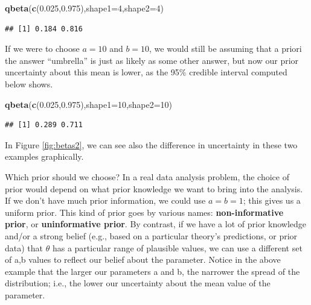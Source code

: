 \documentclass[12pt,]{krantz}
\newenvironment{Shaded}{\begin{snugshade}}{\end{snugshade}}
\newcommand{\KeywordTok}[1]{\textcolor[rgb]{0.13,0.29,0.53}{\textbf{#1}}}
\newcommand{\DataTypeTok}[1]{\textcolor[rgb]{0.13,0.29,0.53}{#1}}
\newcommand{\DecValTok}[1]{\textcolor[rgb]{0.00,0.00,0.81}{#1}}
\newcommand{\FloatTok}[1]{\textcolor[rgb]{0.00,0.00,0.81}{#1}}
\newcommand{\NormalTok}[1]{#1}
\theoremstyle{definition}
\theoremstyle{definition}
\theoremstyle{definition}
\theoremstyle{remark}
\begin{document}
\begin{Shaded}
\begin{Highlighting}[]
\KeywordTok{qbeta}\NormalTok{(}\KeywordTok{c}\NormalTok{(}\FloatTok{0.025}\NormalTok{,}\FloatTok{0.975}\NormalTok{),}\DataTypeTok{shape1=}\DecValTok{4}\NormalTok{,}\DataTypeTok{shape2=}\DecValTok{4}\NormalTok{)}
\end{Highlighting}
\end{Shaded}

\begin{verbatim}
## [1] 0.184 0.816
\end{verbatim}

If we were to choose \(a=10\) and \(b=10\), we would still be assuming
that a priori the answer ``umbrella'' is just as likely as some other
answer, but now our prior uncertainty about this mean is lower, as the
95\% credible interval computed below shows.

\begin{Shaded}
\begin{Highlighting}[]
\KeywordTok{qbeta}\NormalTok{(}\KeywordTok{c}\NormalTok{(}\FloatTok{0.025}\NormalTok{,}\FloatTok{0.975}\NormalTok{),}\DataTypeTok{shape1=}\DecValTok{10}\NormalTok{,}\DataTypeTok{shape2=}\DecValTok{10}\NormalTok{)}
\end{Highlighting}
\end{Shaded}

\begin{verbatim}
## [1] 0.289 0.711
\end{verbatim}

In Figure \ref{fig:betas2}, we can see also the difference in
uncertainty in these two examples graphically.

Which prior should we choose? In a real data analysis problem, the
choice of prior would depend on what prior knowledge we want to bring
into the analysis. If we don't have much prior information, we could use
\(a=b=1\); this gives us a uniform prior. This kind of prior goes by
various names: \textbf{non-informative prior}, or \textbf{uninformative
prior}. By contrast, if we have a lot of prior knowledge and/or a strong
belief (e.g., based on a particular theory's predictions, or prior data)
that \(\theta\) has a particular range of plausible values, we can use a
different set of a,b values to reflect our belief about the parameter.
Notice in the above example that the larger our parameters a and b, the
narrower the spread of the distribution; i.e., the lower our uncertainty
about the mean value of the parameter.
\end{document}
